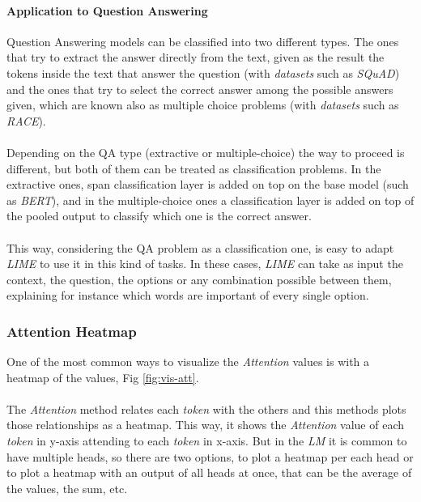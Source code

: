 \paragraph{Application to Question Answering}
Question Answering models can be classified into two different types. The ones that try to extract the answer directly from the text, given as the result the tokens inside the text that answer the question (with \emph{datasets} such as \emph{SQuAD}) and the ones that try to select the correct answer among the possible answers given, which are known also as multiple choice problems (with \emph{datasets} such as \emph{RACE}).
\paragraph{} 
Depending on the QA type (extractive or multiple-choice) the way to proceed is different, but both of them can be treated as classification problems. In the extractive ones, span classification layer is added on top on the base model (such as \emph{BERT}), and in the multiple-choice ones  a classification layer is added on top of the pooled output to classify which one is the correct answer.
\paragraph{}
This way, considering the QA problem as a classification one, is easy to adapt \emph{LIME} to use it in this kind of tasks. In these cases, \emph{LIME} can take as input the context, the question, the options or any combination possible between them, explaining for instance which words are important of every single option.

\subsubsection{Attention Heatmap}
\label{sec:AttentionHeatmap}
\noindent One of the most common ways to visualize the \emph{Attention} values is with a heatmap of the values, Fig \ref{fig:vis-att}.
\paragraph{}
The \emph{Attention} method relates each \emph{token} with the others and this methods plots those relationships as a heatmap. This way, it shows the \emph{Attention} value of each \emph{token} in y-axis attending to each \emph{token} in x-axis. But in the \emph{LM} it is common to have multiple heads, so there are two options, to plot a heatmap per each head or to plot a heatmap with an output of all heads at once, that can be the average of the values, the sum, etc.
